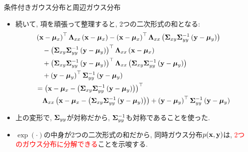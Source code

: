 \documentclass[dvipdfmx,notheorems,t]{beamer}
\begin{document}
\begin{frame}{条件付きガウス分布と周辺ガウス分布}
\begin{itemize}
  \item 続いて, 項を頑張って整理すると, 2つの二次形式の和となる:
  \begin{align*}
    & \left( \vb{x} - \vb*{\mu}_x \right)^\top \vb{\Lambda}_{xx}
      \left( \vb{x} - \vb*{\mu}_x \right)
      - \left( \vb{x} - \vb*{\mu}_x \right)^\top
      \vb{\Lambda}_{xx} \left( \vb{\Sigma}_{xy} \vb{\Sigma}_{yy}^{-1}
      \left( \vb{y} - \vb*{\mu}_y \right) \right) \\
    & \quad - \left( \vb{\Sigma}_{xy} \vb{\Sigma}_{yy}^{-1}
      \left( \vb{y} - \vb*{\mu}_y \right) \right)^\top \vb{\Lambda}_{xx}
      \left( \vb{x} - \vb*{\mu}_x \right) \\
    & \quad + \left( \vb{\Sigma}_{xy} \vb{\Sigma}_{yy}^{-1}
      \left( \vb{y} - \vb*{\mu}_y \right) \right)^\top \vb{\Lambda}_{xx}
      \left( \vb{\Sigma}_{xy} \vb{\Sigma}_{yy}^{-1}
      \left( \vb{y} - \vb*{\mu}_y \right) \right) \\
    & \quad + \left( \vb{y} - \vb*{\mu}_y \right)^\top \vb{\Sigma}_{yy}^{-1}
      \left( \vb{y} - \vb*{\mu}_y \right) \\
    &= \left( \vb{x} - \vb*{\mu}_x - \left( \vb{\Sigma}_{xy} \vb{\Sigma}_{yy}^{-1}
      \left( \vb{y} - \vb*{\mu}_y \right) \right) \right)^\top \\
    & \quad \vb{\Lambda}_{xx}
      \left( \vb{x} - \vb*{\mu}_x - \left( \vb{\Sigma}_{xy} \vb{\Sigma}_{yy}^{-1}
      \left( \vb{y} - \vb*{\mu}_y \right) \right) \right)
      + \left( \vb{y} - \vb*{\mu}_y \right)^\top \vb{\Sigma}_{yy}^{-1}
      \left( \vb{y} - \vb*{\mu}_y \right)
  \end{align*}
  \item 上の変形で, $\vb{\Sigma}_{yy}$が対称だから, $\vb{\Sigma}_{yy}^{-1}$も対称であることを使った.
  \item $\exp(\cdot)$の中身が2つの二次形式の和だから, 同時ガウス分布$p(\vb{x}, \vb{y})$は,
  \textcolor{red}{2つのガウス分布に分解できる}ことを示唆する.
\end{itemize}
\end{frame}
\end{document}
